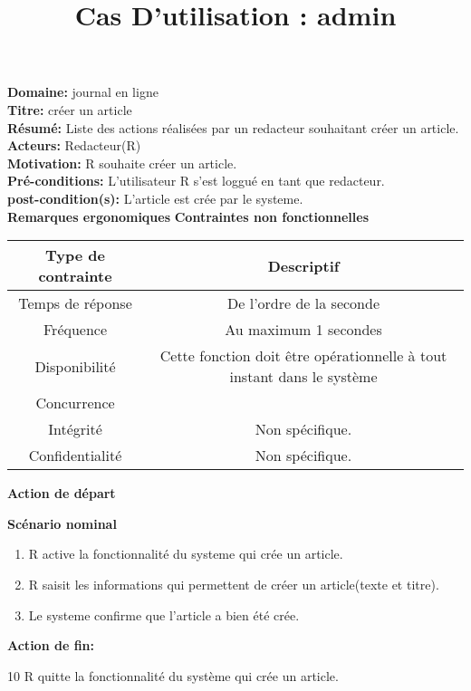 \documentclass[a4paper,10pt]{article}
\title{Cas D'utilisation : admin}
\author{}
\begin{document}
\maketitle



\textbf{Domaine:} journal en ligne\\
\textbf{Titre:} créer un article\\
\textbf{Résumé:} Liste des actions réalisées par un redacteur souhaitant créer un article.\\
\textbf{Acteurs:} Redacteur(R)\\
\textbf{Motivation:} R souhaite créer un article.\\
\textbf{Pré-conditions:} L'utilisateur R s'est loggué en tant que redacteur.\\
\textbf{post-condition(s):} L'article est crée par le systeme.\\

\textbf{Remarques ergonomiques}
\textbf{Contraintes non fonctionnelles}
\begin{center}
  \begin{tabular}{|c|c|}
\hline
   \textbf{Type de contrainte}&\textbf{Descriptif}\\
\hline
Temps de réponse&De l'ordre de la seconde\\
\hline
Fréquence & Au maximum 1 secondes\\
\hline
Disponibilité & Cette fonction doit être opérationnelle à tout instant dans le système\\
\hline
Concurrence&\\
\hline
Intégrité&Non spécifique.\\
\hline
Confidentialité& Non spécifique.\\
\hline

  \end{tabular}
\end{center}

\textbf{Action de départ}

\textbf{Scénario nominal}
\begin{enumerate}
\item R active la fonctionnalité du systeme qui crée un article.
\item R saisit les informations qui permettent de créer un article(texte et titre).
\item Le systeme confirme que l'article a bien été crée.
\end{enumerate}

\textbf{Action de fin:}

10 R quitte la fonctionnalité du système qui crée un article.
\end{document}
